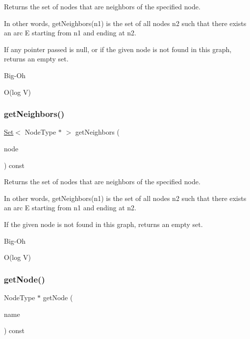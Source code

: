 Returns the set of nodes that are neighbors of the specified node. 

In other words, get\+Neighbors(n1) is the set of all nodes n2 such that there exists an arc E starting from n1 and ending at n2.

If any pointer passed is null, or if the given node is not found in this graph, returns an empty set. \begin{DoxyRefDesc}{Big-\/\+Oh}
\item[\mbox{\hyperlink{BigOh__BigOh000073}{Big-\/\+Oh}}]O(log V) \end{DoxyRefDesc}
\mbox{\label{classGraph_a3a3720906c380f36b50530419330bfe5}} 
\subsubsection{\texorpdfstring{get\+Neighbors()}{getNeighbors()}\hspace{0.1cm}{\footnotesize\ttfamily [2/2]}}
{\footnotesize\ttfamily \mbox{\hyperlink{classSet}{Set}}$<$ Node\+Type $\ast$ $>$ get\+Neighbors (\begin{DoxyParamCaption}\item[{const std\+::string \&}]{node }\end{DoxyParamCaption}) const}



Returns the set of nodes that are neighbors of the specified node. 

In other words, get\+Neighbors(n1) is the set of all nodes n2 such that there exists an arc E starting from n1 and ending at n2.

If the given node is not found in this graph, returns an empty set. \begin{DoxyRefDesc}{Big-\/\+Oh}
\item[\mbox{\hyperlink{BigOh__BigOh000074}{Big-\/\+Oh}}]O(log V) \end{DoxyRefDesc}
\mbox{\label{classGraph_a81487976cf0e576047333c85463c33aa}} 
\subsubsection{\texorpdfstring{get\+Node()}{getNode()}}
{\footnotesize\ttfamily Node\+Type $\ast$ get\+Node (\begin{DoxyParamCaption}\item[{const std\+::string \&}]{name }\end{DoxyParamCaption}) const}



